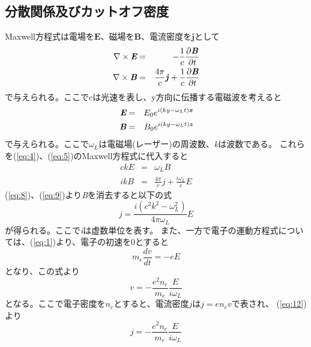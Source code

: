 \documentclass[a4paper,11pt,titlepage]{jsarticle}
\begin{document}
  \subsection{分散関係及びカットオフ密度}
  \rm Maxwell方程式は電場を$\bm{E}$、磁場を$\bm{B}$、電流密度を$\bm{j}$として
  \begin{eqnarray}
    \label{eq:4}
    \nabla \times \textit{\textbf{E}} &=& 
    -\frac{1}{c}\frac{\partial \textbf{\textit{\textbf{B}}}}{\partial t}\\
    \label{eq:5}
    \nabla \times \textit{\textbf{B}} &=& \frac{4\pi}{c} 
    \textbf{\textit{j}} +\frac{1}{c}\frac{\partial \textit{\textbf{B}} }{\partial t}
  \end{eqnarray}
  で与えられる。ここでcは光速を表し、y方向に伝播する電磁波を考えると
  \begin{eqnarray}
    \label{eq:6}
    \textit{\textbf{E}}&=&E_0 e^{i(ky-\omega_L t) \textit{\textbf{x}}}\\
    \label{eq:7}
    \textit{\textbf{B}}&=&B_0 e^{i(ky-\omega_L t) \textit{\textbf{z}}}
  \end{eqnarray}
  で与えられる。ここで$\omega_L$は電磁場(レーザー)の周波数、\textit{k}は波数である。
  これらを(\ref{eq:4})、(\ref{eq:5})のMaxwell方程式に代入すると
  \begin{eqnarray}
    \label{eq:8}
    ckE&=&\omega_L B\\
    \label{eq:9}
    ikB&=&\frac{4\pi}{c}j + \frac{i\omega_L}{c} \textit{E}
  \end{eqnarray}
  (\ref{eq:8})、(\ref{eq:9})より\textit{B}を消去すると以下の式
  \begin{equation}
    \label{eq:10}
    j=\frac{i(c^2 k^2 -\omega_L^2)}{4\pi \omega_L}E
  \end{equation}
  が得られる。ここで\textit{i}は虚数単位を表す。
  また、一方で電子の運動方程式については、(\ref{eq:1})より、電子の初速を0とすると
  \begin{equation}
    \label{eq:11}
    m_e \frac{\textit{dv}}{\textit{dt}}=-e\textit{E}
  \end{equation}
  となり、この式より
  \begin{equation}
    \label{eq:12}
    \textit{v}=-{\frac{e^2 n_e}{m_e} \frac{E}{i\omega_L}}
  \end{equation}
  となる。ここで電子密度を$n_e$とすると、電流密度$j$は$j=en_e v$で表され、
  (\ref{eq:12})より
  \begin{equation}
    \label{eq:13}
    j=-\frac{e^2 n_e}{m_e} \frac{E}{i\omega_L}
  \end{equation}
\end{document}
